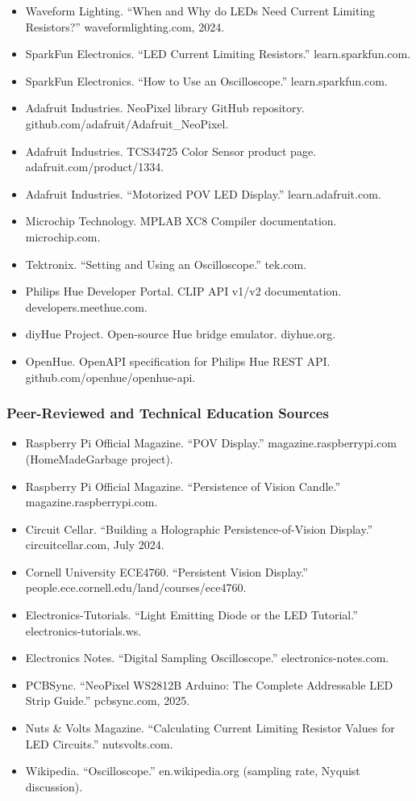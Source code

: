 \documentclass[11pt,letterpaper]{article}
\begin{document}
\begin{itemize}[noitemsep]
  \item Waveform Lighting. ``When and Why do LEDs Need Current Limiting Resistors?'' waveformlighting.com, 2024.
  \item SparkFun Electronics. ``LED Current Limiting Resistors.'' learn.sparkfun.com.
  \item SparkFun Electronics. ``How to Use an Oscilloscope.'' learn.sparkfun.com.
  \item Adafruit Industries. NeoPixel library GitHub repository. github.com/adafruit/Adafruit\_NeoPixel.
  \item Adafruit Industries. TCS34725 Color Sensor product page. adafruit.com/product/1334.
  \item Adafruit Industries. ``Motorized POV LED Display.'' learn.adafruit.com.
  \item Microchip Technology. MPLAB XC8 Compiler documentation. microchip.com.
  \item Tektronix. ``Setting and Using an Oscilloscope.'' tek.com.
  \item Philips Hue Developer Portal. CLIP API v1/v2 documentation. developers.meethue.com.
  \item diyHue Project. Open-source Hue bridge emulator. diyhue.org.
  \item OpenHue. OpenAPI specification for Philips Hue REST API. github.com/openhue/openhue-api.
\end{itemize}

\subsubsection{Peer-Reviewed and Technical Education Sources}

\begin{itemize}[noitemsep]
  \item Raspberry Pi Official Magazine. ``POV Display.'' magazine.raspberrypi.com (HomeMadeGarbage project).
  \item Raspberry Pi Official Magazine. ``Persistence of Vision Candle.'' magazine.raspberrypi.com.
  \item Circuit Cellar. ``Building a Holographic Persistence-of-Vision Display.'' circuitcellar.com, July 2024.
  \item Cornell University ECE4760. ``Persistent Vision Display.'' people.ece.cornell.edu/land/courses/ece4760.
  \item Electronics-Tutorials. ``Light Emitting Diode or the LED Tutorial.'' electronics-tutorials.ws.
  \item Electronics Notes. ``Digital Sampling Oscilloscope.'' electronics-notes.com.
  \item PCBSync. ``NeoPixel WS2812B Arduino: The Complete Addressable LED Strip Guide.'' pcbsync.com, 2025.
  \item Nuts \& Volts Magazine. ``Calculating Current Limiting Resistor Values for LED Circuits.'' nutsvolts.com.
  \item Wikipedia. ``Oscilloscope.'' en.wikipedia.org (sampling rate, Nyquist discussion).
\end{itemize}
\end{document}
